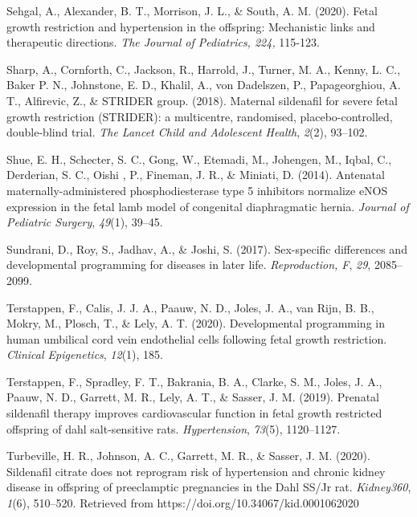 \documentclass[authordate, empirical]{jote-new-article}
\begin{document}
	Sehgal, A., Alexander, B. T., Morrison, J. L., \& South, A. M. (2020). Fetal growth restriction and hypertension in the offspring: Mechanistic links and therapeutic directions. \emph{The Journal of Pediatrics, 224, }115-123.



	Sharp, A., Cornforth, C., Jackson, R., Harrold, J., Turner, M. A., Kenny, L. C., Baker P. N., Johnstone, E. D., Khalil, A., von Dadelszen, P., Papageorghiou, A. T., Alfirevic, Z., \& STRIDER group. (2018). Maternal sildenafil for severe fetal growth restriction (STRIDER): a multicentre, randomised, placebo-controlled, double-blind trial. \emph{The Lancet Child and Adolescent Health}, \emph{2}(2), 93--102.



	Shue, E. H., Schecter, S. C., Gong, W., Etemadi, M., Johengen, M., Iqbal, C., Derderian, S. C., Oishi , P., Fineman, J. R., \& Miniati, D. (2014). Antenatal maternally-administered phosphodiesterase type 5 inhibitors normalize eNOS expression in the fetal lamb model of congenital diaphragmatic hernia. \emph{Journal of Pediatric Surgery}, \emph{49}(1), 39--45.



	Sundrani, D., Roy, S., Jadhav, A., \& Joshi, S. (2017). Sex-specific differences and developmental programming for diseases in later life. \emph{Reproduction, F}, \emph{29}, 2085--2099.



	Terstappen, F., Calis, J. J. A., Paauw, N. D., Joles, J. A., van Rijn, B. B., Mokry, M., Plosch, T., \& Lely, A. T. (2020). Developmental programming in human umbilical cord vein endothelial cells following fetal growth restriction. \emph{Clinical Epigenetics}, \emph{12}(1), 185.



	Terstappen, F., Spradley, F. T., Bakrania, B. A., Clarke, S. M., Joles, J. A., Paauw, N. D., Garrett, M. R., Lely, A. T., \& Sasser, J. M. (2019). Prenatal sildenafil therapy improves cardiovascular function in fetal growth restricted offspring of dahl salt-sensitive rats. \emph{Hypertension}, \emph{73}(5), 1120--1127.



	Turbeville, H. R., Johnson, A. C., Garrett, M. R., \& Sasser, J. M. (2020). Sildenafil citrate does not reprogram risk of hypertension and chronic kidney disease in offspring of preeclamptic pregnancies in the Dahl SS/Jr rat. \emph{Kidney360}, \emph{1}(6), 510--520. Retrieved from https://doi.org/10.34067/kid.0001062020
\end{document}
